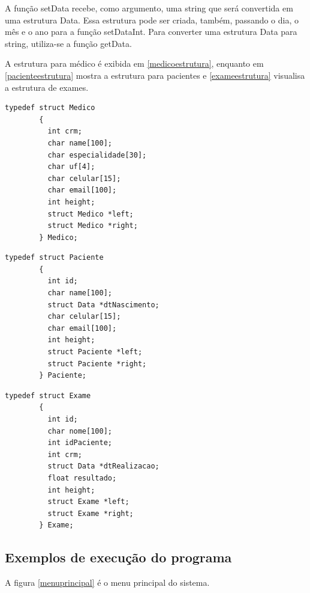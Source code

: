\documentclass[a4paper,12pt,article]{abntex2}
\begin{document}
      A função setData recebe, como argumento, uma string que será convertida em uma estrutura Data. Essa estrutura pode ser criada, também, passando o dia, o mês e o ano para a função 
      setDataInt. Para converter uma estrutura Data para string, utiliza-se a função getData.

      A estrutura para médico é exibida em \ref{medicoestrutura}, enquanto em \ref{pacienteestrutura} mostra a estrutura para pacientes e \ref{exameestrutura} visualisa a estrutura
      de exames.

      \begin{lstlisting}[float=h, frame=single, label=medicoestrutura, caption=Estrutura para o objeto médicos]
        typedef struct Medico
        {
          int crm;
          char name[100];
          char especialidade[30];
          char uf[4];
          char celular[15];
          char email[100];
          int height;
          struct Medico *left;
          struct Medico *right;
        } Medico;
      \end{lstlisting}

      \begin{lstlisting}[float=h, frame=single, label=pacienteestrutura, caption=Estrutura para o objeto pacientes]
        typedef struct Paciente
        {
          int id;
          char name[100];
          struct Data *dtNascimento;
          char celular[15];
          char email[100];
          int height;
          struct Paciente *left;
          struct Paciente *right;
        } Paciente;
      \end{lstlisting}
      
      \begin{lstlisting}[float=h, frame=single, label=exameestrutura, caption=Estrutura para o objeto exames]
        typedef struct Exame
        {
          int id;
          char nome[100];
          int idPaciente;
          int crm;
          struct Data *dtRealizacao;
          float resultado;
          int height;
          struct Exame *left;
          struct Exame *right;
        } Exame;
      \end{lstlisting}

    \subsection{Exemplos de execução do programa}

      A figura \ref{menuprincipal} é o menu principal do sistema.
\end{document}
